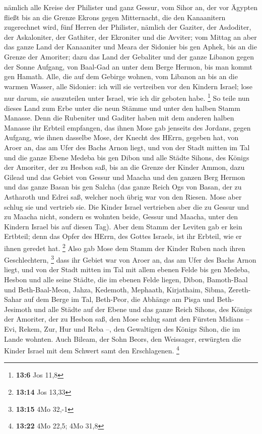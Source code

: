  nämlich alle Kreise der Philister und ganz Gessur,
 vom Sihor an, der vor Ägypten fließt bis an die Grenze
Ekrons gegen Mitternacht, die den Kanaanitern zugerechnet wird, fünf
Herren der Philister, nämlich der Gaziter, der Asdoditer, der
Askaloniter, der Gathiter, der Ekroniter und die Avviter; 
vom Mittag an aber das ganze Land der Kanaaniter und Meara der Sidonier
bis gen Aphek, bis an die Grenze der Amoriter;  dazu das
Land der Gebaliter und der ganze Libanon gegen der Sonne Aufgang, von
Baal-Gad an unter dem Berge Hermon, bis man kommt gen Hamath.
 Alle, die auf dem Gebirge wohnen, vom Libanon an bis an die
warmen Wasser, alle Sidonier: ich will sie vertreiben vor den Kindern
Israel; lose nur darum, sie auszuteilen unter Israel, wie ich dir
geboten habe. \footnote{\textbf{13:6} Jos 11,8}  So teile
nun dieses Land zum Erbe unter die neun Stämme und unter den halben
Stamm Manasse.  Denn die Rubeniter und Gaditer haben mit dem
anderen halben Manasse ihr Erbteil empfangen, das ihnen Mose gab
jenseits des Jordans, gegen Aufgang, wie ihnen dasselbe Mose, der Knecht
des HErrn, gegeben hat,  von Aroer an, das am Ufer des Bachs
Arnon liegt, und von der Stadt mitten im Tal und die ganze Ebene Medeba
bis gen Dibon  und alle Städte Sihons, des Königs der
Amoriter, der zu Hesbon saß, bis an die Grenze der Kinder Ammon,
 dazu Gilead und das Gebiet von Gessur und Maacha und den
ganzen Berg Hermon und das ganze Basan bis gen Salcha  (das
ganze Reich Ogs von Basan, der zu Astharoth und Edrei saß, welcher noch
übrig war von den Riesen. Mose aber schlug sie und vertrieb sie.
 Die Kinder Israel vertrieben aber die zu Gessur und zu
Maacha nicht, sondern es wohnten beide, Gessur und Maacha, unter den
Kindern Israel bis auf diesen Tag).  Aber dem Stamm der
Leviten gab er kein Ertbteil; denn das Opfer des HErrn, des Gottes
Israels, ist ihr Erbteil, wie er ihnen geredet hat. \footnote{\textbf{13:14}
  Jos 13,33}  Also gab Mose dem Stamm der Kinder Ruben nach
ihren Geschlechtern, \footnote{\textbf{13:15} 4Mo 32,-1} 
dass ihr Gebiet war von Aroer an, das am Ufer des Bachs Arnon liegt, und
von der Stadt mitten im Tal mit allem ebenen Felde bis gen Medeba,
 Hesbon und alle seine Städte, die im ebenen Felde liegen,
Dibon, Bamoth-Baal und Beth-Baal-Meon,  Jahza, Kedemoth,
Mephaath,  Kirjathaim, Sibma, Zereth-Sahar auf dem Berge im
Tal,  Beth-Peor, die Abhänge am Pisga und Beth-Jesimoth
 und alle Städte auf der Ebene und das ganze Reich Sihons,
des Königs der Amoriter, der zu Hesbon saß, den Mose schlug samt den
Fürsten Midians -- Evi, Rekem, Zur, Hur und Reba --, den Gewaltigen des
Königs Sihon, die im Lande wohnten.  Auch Bileam, der Sohn
Beors, den Weissager, erwürgten die Kinder Israel mit dem Schwert samt
den Erschlagenen. \footnote{\textbf{13:22} 4Mo 22,5; 4Mo 31,8}

